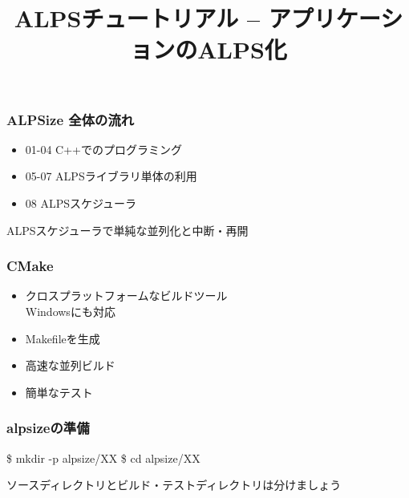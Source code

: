 \title{ALPSチュートリアル -- アプリケーションのALPS化}



\begin{frame}
  \titlepage
\end{frame}


\begin{frame}
  \frametitle{ALPSize 全体の流れ}
  \begin{itemize}
  \item 01-04 C++でのプログラミング
  \item 05-07 ALPSライブラリ単体の利用
  \item \alert{08 ALPSスケジューラ}
  \end{itemize}
  \begin{block}{}
    ALPSスケジューラで単純な並列化と中断・再開
  \end{block}
\end{frame}

\begin{frame}
  \frametitle{CMake}
  \begin{itemize}
  \item クロスプラットフォームなビルドツール\\
    Windowsにも対応
  \item Makefileを生成
  \item 高速な並列ビルド
  \item 簡単なテスト
  \end{itemize}
\end{frame}

\begin{frame}[fragile]
  \frametitle{alpsizeの準備}
\begin{semiverbatim}
\$ mkdir -p alpsize/XX
\$ cd alpsize/XX
\end{semiverbatim}
  \begin{block}{}
    ソースディレクトリとビルド・テストディレクトリは分けましょう
  \end{block}
\end{frame}

